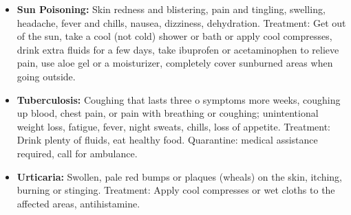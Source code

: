 \begin{itemize}
\item \textbf{Sun Poisoning:} Skin redness and blistering, pain and tingling, swelling, headache, fever and chills, nausea, dizziness, dehydration. Treatment: Get out of the sun, take a cool (not cold) shower or bath or apply cool compresses, drink extra fluids for a few days, take ibuprofen or acetaminophen to relieve pain, use aloe gel or a moisturizer, completely cover sunburned areas when going outside.

\item \textbf{Tuberculosis:} Coughing that lasts three o symptoms more weeks, coughing up blood, chest pain, or pain with breathing or coughing; unintentional weight loss, fatigue, fever, night sweats, chills, loss of appetite. Treatment: Drink plenty of fluids, eat healthy food. Quarantine: medical assistance required, call for ambulance.

\item \textbf{Urticaria:} Swollen, pale red bumps or plaques (wheals) on the skin, itching, burning or stinging. Treatment: Apply cool compresses or wet cloths to the affected areas, antihistamine.

\end{itemize}
